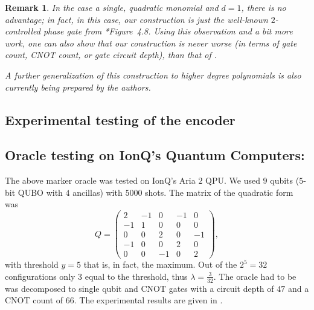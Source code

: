 \documentclass[reqno, 12pt]{amsart}
\numberwithin{equation}{section}                %
\newtheorem{remark}[theorem]{Remark}
\begin{document}
\smallskip

\begin{remark}
   In the case a single, quadratic monomial and $d = 1$, there is no advantage; in fact, in this case, our construction is just the well-known $2$-controlled phase gate from \cite{nielsen_quantum_2010}*{Figure~4.8}. Using this observation and a bit more work, one can also show that our construction is never worse (in terms of gate count, CNOT count, or gate circuit depth), than that of \cite{gilliam_grover_2021}.

   A further generalization of this construction to higher degree polynomials is also currently being prepared by the authors.
\end{remark}

\medskip

\subsection{Experimental testing of the encoder}

\subsection{Oracle testing on IonQ's Quantum Computers:} The above marker oracle was tested on IonQ's Aria $2$ QPU. We used $9$ qubits ($5$-bit QUBO with $4$ ancillas) with $5000$ shots. The matrix of the quadratic form was
\begin{equation}
   Q = \begin{pmatrix}
         2 & - 1 & 0 & - 1 & 0 \\
         - 1 & 1 & 0 & 0 & 0 \\
         0 & 0 & 2 & 0 & - 1 \\
         - 1 & 0 & 0 & 2 & 0 \\
         0 & 0 & - 1 & 0 & 2
      \end{pmatrix},
\end{equation}
with threshold $y = 5$ that is, in fact, the maximum. Out of the $2^5 = 32$ configurations only $3$ equal to the threshold, thus $\lambda = \tfrac{3}{32}$. The oracle had to be was decomposed to single qubit and CNOT gates with a circuit depth of $47$ and a CNOT count of $66$. The experimental results are given in .
\end{document}
